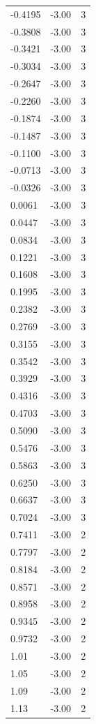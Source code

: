 \begin{longtable}{lrr}
  -0.4195 & -3.00 & 3 \\
  -0.3808 & -3.00 & 3 \\
  -0.3421 & -3.00 & 3 \\
  -0.3034 & -3.00 & 3 \\
  -0.2647 & -3.00 & 3 \\
  -0.2260 & -3.00 & 3 \\
  -0.1874 & -3.00 & 3 \\
  -0.1487 & -3.00 & 3 \\
  -0.1100 & -3.00 & 3 \\
  -0.0713 & -3.00 & 3 \\
  -0.0326 & -3.00 & 3 \\
  0.0061 & -3.00 & 3 \\
  0.0447 & -3.00 & 3 \\
  0.0834 & -3.00 & 3 \\
  0.1221 & -3.00 & 3 \\
  0.1608 & -3.00 & 3 \\
  0.1995 & -3.00 & 3 \\
  0.2382 & -3.00 & 3 \\
  0.2769 & -3.00 & 3 \\
  0.3155 & -3.00 & 3 \\
  0.3542 & -3.00 & 3 \\
  0.3929 & -3.00 & 3 \\
  0.4316 & -3.00 & 3 \\
  0.4703 & -3.00 & 3 \\
  0.5090 & -3.00 & 3 \\
  0.5476 & -3.00 & 3 \\
  0.5863 & -3.00 & 3 \\
  0.6250 & -3.00 & 3 \\
  0.6637 & -3.00 & 3 \\
  0.7024 & -3.00 & 3 \\
  0.7411 & -3.00 & 2 \\
  0.7797 & -3.00 & 2 \\
  0.8184 & -3.00 & 2 \\
  0.8571 & -3.00 & 2 \\
  0.8958 & -3.00 & 2 \\
  0.9345 & -3.00 & 2 \\
  0.9732 & -3.00 & 2 \\
  1.01 & -3.00 & 2 \\
  1.05 & -3.00 & 2 \\
  1.09 & -3.00 & 2 \\
  1.13 & -3.00 & 2 \\

\end{longtable}
